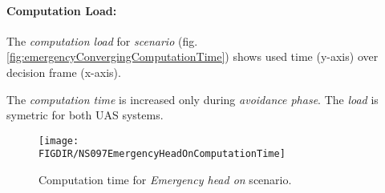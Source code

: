 \paragraph{Computation Load:} The \emph{computation load} for \emph{scenario} (fig.\ref{fig:emergencyConvergingComputationTime}) shows used time (y-axis) over decision frame (x-axis).

The \emph{computation time} is increased only during \emph{avoidance phase}. The \emph{load} is symetric for both UAS systems.

\begin{figure}[H]
    \centering
    \texttt{[image: \\FIGDIR/NS097EmergencyHeadOnComputationTime]} 
    \caption{Computation time for \emph{Emergency head on} scenario.}
    \label{fig:emergencyHeadOnComputationTime}
\end{figure}